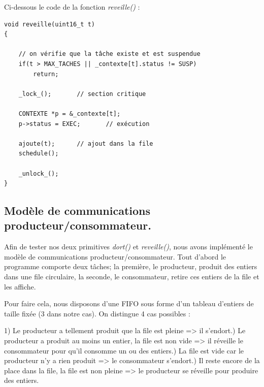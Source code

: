 \documentclass[a4paper,12pt]{report}
\begin{document}
Ci-dessous le code de la fonction \textit{reveille()} :

\begin{lstlisting}
void reveille(uint16_t t)
{

	// on vérifie que la tâche existe et est suspendue
	if(t > MAX_TACHES || _contexte[t].status != SUSP)	 
		return;

	_lock_();		// section critique

	CONTEXTE *p = &_contexte[t];
	p->status = EXEC;		// exécution

	ajoute(t);		// ajout dans la file
	schedule();

	_unlock_();
}
\end{lstlisting}

\subsection{Modèle de communications producteur/consommateur.}

Afin de tester nos deux primitives \textit{dort()} et \textit{reveille()}, nous avons implémenté le modèle de communications producteur/consommateur. Tout d'abord le programme comporte deux tâches; la première, le producteur, produit des entiers dans une file circulaire, la seconde, le consommateur, retire ces entiers de la file et les affiche.\newline

Pour faire cela, nous disposons d'une FIFO sous forme d'un tableau d'entiers de taille fixée (3 dans notre cas). On distingue 4 cas possibles :

1) Le producteur a tellement produit que la file est pleine => il s'endort.) Le producteur a produit au moins un entier, la file est non vide => il réveille le consommateur pour qu'il consomme un ou des entiers.) La file est vide car le producteur n'y a rien produit => le consommateur s'endort.) Il reste encore de la place dans la file, la file est non pleine => le producteur se réveille pour produire des entiers.\newline
\end{document}
